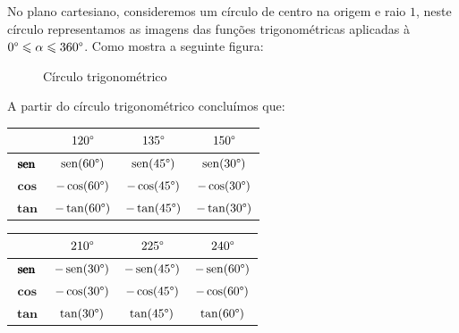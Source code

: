  No plano cartesiano, consideremos um círculo de centro na origem e raio $1$, neste círculo representamos as imagens das funções trigonométricas aplicadas à  $0 \degree \leqslant \alpha \leqslant 360 \degree$. Como mostra a seguinte figura:
 \begin{figure}[H]
   \centering
   \caption{Círculo trigonométrico}
  \end{figure}

  A partir do círculo trigonométrico concluímos que:

  \begin{table}[H]
 \centering
 \begin{tabular}{|c|c|c|c|} \hline
 \rowcolor{cinza}
               &  $120\degree$  & $135\degree$  &  $150\degree$ \\\hline
  $\pmb{\operatorname{sen}}$ & $\operatorname{sen}(60\degree)$ &$\operatorname{sen}(45\degree)$ & $\operatorname{sen}(30\degree)$  \\\hline
  $\pmb{\cos}$ & $-\cos(60\degree)$ &$-\cos(45\degree)$ & $-\cos(30\degree)$  \\\hline
  $\pmb{\tan}$ & $-\tan(60\degree)$ &$-\tan(45\degree)$ & $-\tan(30\degree)$  \\\hline
 \end{tabular}
\end{table}

 \begin{table}[H]
 \centering
 \begin{tabular}{|c|c|c|c|} \hline
 \rowcolor{cinza}
                & $210\degree$ & $225\degree$  & $240\degree$  \\\hline
  $\pmb{\operatorname{sen}}$ &  $-\operatorname{sen}(30\degree)$ & $-\operatorname{sen}(45\degree)$ & $-\operatorname{sen}(60\degree)$  \\\hline
  $\pmb{\cos}$ &  $-\cos(30\degree)$ & $-\cos(45\degree)$ & $-\cos(60\degree)$  \\\hline
  $\pmb{\tan}$ &  $\tan(30\degree)$ & $\tan(45\degree)$ & $\tan(60\degree)$   \\\hline
 \end{tabular}
\end{table}

